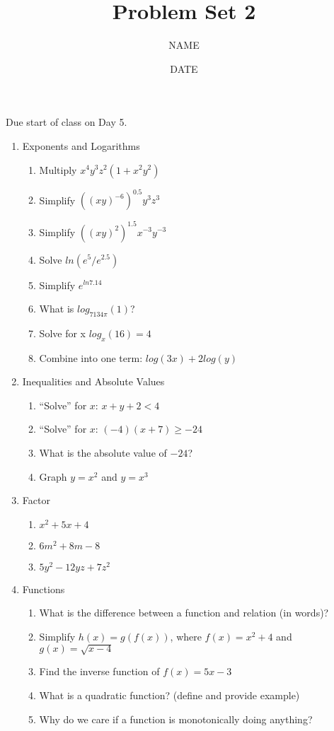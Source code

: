\documentclass[12pt,thmsa]{article}
\title{Problem Set 2}
\author{NAME}
\date{DATE}
\begin{document}
\maketitle

Due start of class on Day 5. 

\begin{enumerate}
    \item Exponents and Logarithms
        \begin{enumerate}
            \item Multiply $x^4 y^3 z^2 (1 + x^2 y^2)$
            \item Simplify $((xy)^{-6})^{0.5} y^3z^{3}$
            \item Simplify $((xy)^2)^{1.5} x^{-3}y^{-3}$
            \item Solve $ln(e^5/e^{2.5})$
            \item Simplify $e^{ln 7.14}$
            \item What is $log_{7134\pi}(1)$?
            \item Solve for x $log_x(16)=4$ 
            \item Combine into one term: $log(3x)+2log(y)$ 
        \end{enumerate}

    \item Inequalities and Absolute Values
        \begin{enumerate}
            \item ``Solve'' for $x$: $x + y +2 < 4$
            \item ``Solve'' for $x$: $(-4)(x + 7) \geq -24$
            \item What is the absolute value of $-24$?
            \item Graph $y = x^2$ and $y=x^3$ 
        \end{enumerate}

    \item Factor
        \begin{enumerate}
            \item $x^2+ 5x+4$
            \item $6m^2+8m-8$ 
            \item $5y^2-12yz+7z^2$ 
        \end{enumerate}

    \item Functions
        \begin{enumerate}
            \item What is the difference between a function and relation (in words)?
            \item Simplify $h(x)=g(f(x))$, where $f(x)=x^2+4$ and $g(x)=\sqrt{x-4}$ 
            \item Find the inverse function of $f(x)=5x-3$ 
            \item What is a quadratic function? (define and provide example) 
            \item Why do we care if a function is monotonically doing anything?
        \end{enumerate}


\end{enumerate}
\end{document}
